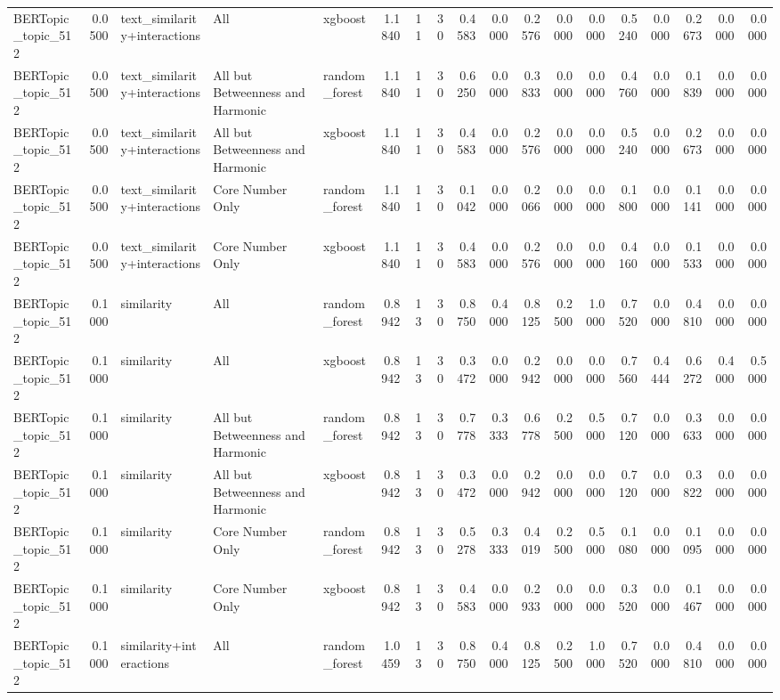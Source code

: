 \begin{tabular}{lrlllrrrrrrrrrrrrr}
BERTopic_topic_512 & 0.0500 & text_similarity+interactions & All & xgboost & 1.1840 & 11 & 30 & 0.4583 & 0.0000 & 0.2576 & 0.0000 & 0.0000 & 0.5240 & 0.0000 & 0.2673 & 0.0000 & 0.0000 \\
BERTopic_topic_512 & 0.0500 & text_similarity+interactions & All but Betweenness and Harmonic & random_forest & 1.1840 & 11 & 30 & 0.6250 & 0.0000 & 0.3833 & 0.0000 & 0.0000 & 0.4760 & 0.0000 & 0.1839 & 0.0000 & 0.0000 \\
BERTopic_topic_512 & 0.0500 & text_similarity+interactions & All but Betweenness and Harmonic & xgboost & 1.1840 & 11 & 30 & 0.4583 & 0.0000 & 0.2576 & 0.0000 & 0.0000 & 0.5240 & 0.0000 & 0.2673 & 0.0000 & 0.0000 \\
BERTopic_topic_512 & 0.0500 & text_similarity+interactions & Core Number Only & random_forest & 1.1840 & 11 & 30 & 0.1042 & 0.0000 & 0.2066 & 0.0000 & 0.0000 & 0.1800 & 0.0000 & 0.1141 & 0.0000 & 0.0000 \\
BERTopic_topic_512 & 0.0500 & text_similarity+interactions & Core Number Only & xgboost & 1.1840 & 11 & 30 & 0.4583 & 0.0000 & 0.2576 & 0.0000 & 0.0000 & 0.4160 & 0.0000 & 0.1533 & 0.0000 & 0.0000 \\
BERTopic_topic_512 & 0.1000 & similarity & All & random_forest & 0.8942 & 13 & 30 & 0.8750 & 0.4000 & 0.8125 & 0.2500 & 1.0000 & 0.7520 & 0.0000 & 0.4810 & 0.0000 & 0.0000 \\
BERTopic_topic_512 & 0.1000 & similarity & All & xgboost & 0.8942 & 13 & 30 & 0.3472 & 0.0000 & 0.2942 & 0.0000 & 0.0000 & 0.7560 & 0.4444 & 0.6272 & 0.4000 & 0.5000 \\
BERTopic_topic_512 & 0.1000 & similarity & All but Betweenness and Harmonic & random_forest & 0.8942 & 13 & 30 & 0.7778 & 0.3333 & 0.6778 & 0.2500 & 0.5000 & 0.7120 & 0.0000 & 0.3633 & 0.0000 & 0.0000 \\
BERTopic_topic_512 & 0.1000 & similarity & All but Betweenness and Harmonic & xgboost & 0.8942 & 13 & 30 & 0.3472 & 0.0000 & 0.2942 & 0.0000 & 0.0000 & 0.7120 & 0.0000 & 0.3822 & 0.0000 & 0.0000 \\
BERTopic_topic_512 & 0.1000 & similarity & Core Number Only & random_forest & 0.8942 & 13 & 30 & 0.5278 & 0.3333 & 0.4019 & 0.2500 & 0.5000 & 0.1080 & 0.0000 & 0.1095 & 0.0000 & 0.0000 \\
BERTopic_topic_512 & 0.1000 & similarity & Core Number Only & xgboost & 0.8942 & 13 & 30 & 0.4583 & 0.0000 & 0.2933 & 0.0000 & 0.0000 & 0.3520 & 0.0000 & 0.1467 & 0.0000 & 0.0000 \\
BERTopic_topic_512 & 0.1000 & similarity+interactions & All & random_forest & 1.0459 & 13 & 30 & 0.8750 & 0.4000 & 0.8125 & 0.2500 & 1.0000 & 0.7520 & 0.0000 & 0.4810 & 0.0000 & 0.0000 \\

\end{tabular}
